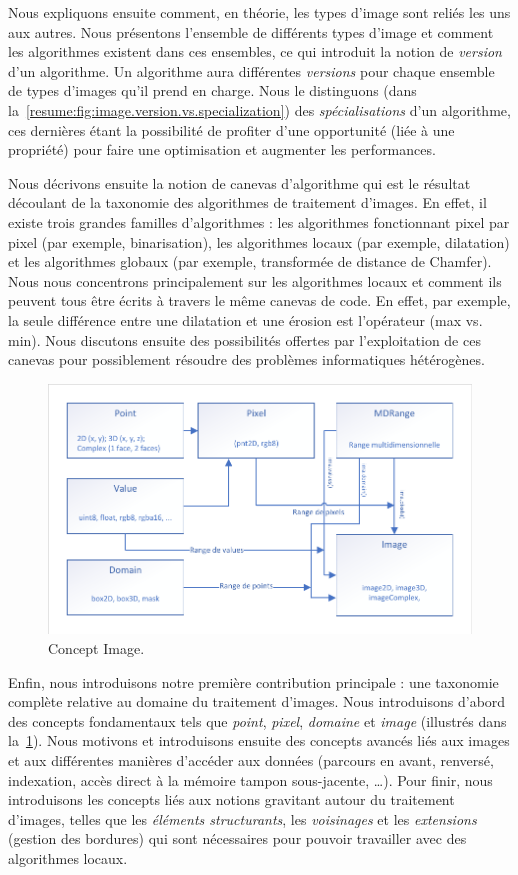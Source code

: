 Nous expliquons ensuite comment, en théorie, les types d'image sont reliés les uns aux autres. Nous présentons
l'ensemble de différents types d'image et comment les algorithmes existent dans ces ensembles, ce qui introduit la
notion de \emph{version} d'un algorithme. Un algorithme aura différentes \emph{versions} pour chaque ensemble de types
d'images qu'il prend en charge. Nous le distinguons (dans la~\cref{resume:fig:image.version.vs.specialization}) des
\emph{spécialisations} d'un algorithme, ces dernières étant la possibilité de profiter d'une opportunité (liée à une
propriété) pour faire une optimisation et augmenter les performances.

Nous décrivons ensuite la notion de canevas d'algorithme qui est le résultat découlant de la taxonomie des
algorithmes de traitement d'images. En effet, il existe trois grandes familles d'algorithmes : les algorithmes
fonctionnant pixel par pixel (par exemple, binarisation), les algorithmes locaux (par exemple, dilatation) et les
algorithmes globaux (par exemple, transformée de distance de Chamfer). Nous nous concentrons principalement sur les
algorithmes locaux et comment ils peuvent tous être écrits à travers le même canevas de code. En effet, par exemple, la
seule différence entre une dilatation et une érosion est l'opérateur (max vs. min). Nous discutons ensuite des
possibilités offertes par l'exploitation de ces canevas pour possiblement résoudre des problèmes informatiques
hétérogènes.

\begin{figure}[htbp]
  \centering
  \includegraphics[width=.8\linewidth]{../figures/concepts/image_fr}
  \caption[]{Concept Image.}
  \label{resume:fig:concept.image}
\end{figure}

Enfin, nous introduisons notre première contribution principale : une taxonomie complète relative au domaine du
traitement d'images. Nous introduisons d'abord des concepts fondamentaux tels que \emph{point}, \emph{pixel},
\emph{domaine} et \emph{image} (illustrés dans la~\cref{resume:fig:concept.image}). Nous motivons et introduisons
ensuite des concepts avancés liés aux images et aux différentes manières d'accéder aux données (parcours en avant,
renversé, indexation, accès direct à la mémoire tampon sous-jacente, \ldots). Pour finir, nous introduisons les concepts
liés aux notions gravitant autour du traitement d'images, telles que les \emph{éléments structurants}, les
\emph{voisinages} et les \emph{extensions} (gestion des bordures) qui sont nécessaires pour pouvoir travailler avec des
algorithmes locaux.

